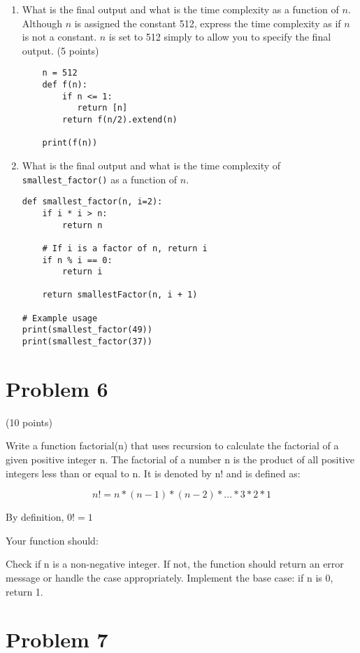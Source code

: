 \documentclass{article}
\begin{document}
\begin{enumerate}[label=(\alph*)]
\item  What is the final output and what is the time complexity as a
  function of $n$. Although $n$ is assigned the constant 512, express
  the time complexity as if $n$ is not a constant.  $n$ is set to 512
  simply to allow you to specify the final output. (5 points)
  
\begin{verbatim}
    n = 512
    def f(n):
        if n <= 1:
           return [n]
        return f(n/2).extend(n)

    print(f(n))
\end{verbatim}

\item What is the final output and what is the time complexity of
  \verb|smallest_factor()| as a function of $n$.
  
\begin{verbatim}
def smallest_factor(n, i=2):
    if i * i > n:
        return n
    
    # If i is a factor of n, return i
    if n % i == 0:
        return i
    
    return smallestFactor(n, i + 1)

# Example usage
print(smallest_factor(49)) 
print(smallest_factor(37))
\end{verbatim}

\end{enumerate}

\section{Problem 6}

(10 points)

Write a function factorial(n) that uses recursion to calculate the
factorial of a given positive integer n. The factorial of a number n
is the product of all positive integers less than or equal to n. It is
denoted by n! and is defined as:

\[
n! = n * (n-1) * (n-2) * ... * 3 * 2 * 1
\]

By definition, $0! = 1$

Your function should:

Check if n is a non-negative integer. If not, the function should return an error message or handle the case appropriately.
Implement the base case: if n is 0, return 1.


\section{Problem 7}
\end{document}
